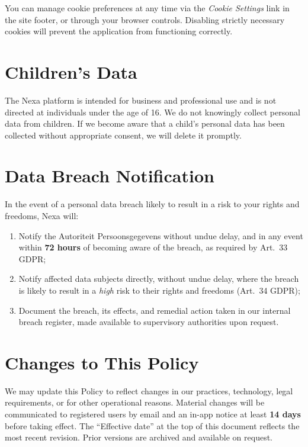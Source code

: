 \documentclass[11pt,a4paper]{scrartcl}
\begin{document}
You can manage cookie preferences at any time via the \textit{Cookie Settings} link in the site
footer, or through your browser controls. Disabling strictly necessary cookies will prevent the
application from functioning correctly.

\section{Children's Data}

The Nexa platform is intended for business and professional use and is not directed at
individuals under the age of 16. We do not knowingly collect personal data from children. If we
become aware that a child's personal data has been collected without appropriate consent, we
will delete it promptly.

\section{Data Breach Notification}

In the event of a personal data breach likely to result in a risk to your rights and freedoms,
Nexa will:

\begin{enumerate}
  \item Notify the Autoriteit Persoonsgegevens without undue delay, and in any event within
        \textbf{72 hours} of becoming aware of the breach, as required by Art.\ 33 GDPR;
  \item Notify affected data subjects directly, without undue delay, where the breach is
        likely to result in a \textit{high} risk to their rights and freedoms (Art.\ 34
        GDPR);
  \item Document the breach, its effects, and remedial action taken in our internal breach
        register, made available to supervisory authorities upon request.
\end{enumerate}

\section{Changes to This Policy}

We may update this Policy to reflect changes in our practices, technology, legal requirements,
or for other operational reasons. Material changes will be communicated to registered users by
email and an in-app notice at least \textbf{14 days} before taking effect. The ``Effective
date'' at the top of this document reflects the most recent revision. Prior versions are
archived and available on request.
\end{document}
